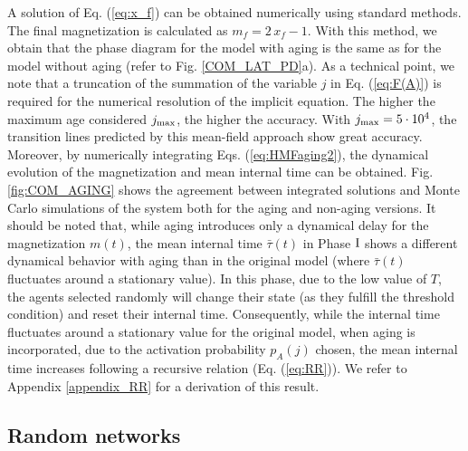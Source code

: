 A solution of Eq. (\ref{eq:x_f}) can be obtained numerically using standard methods. The final magnetization is calculated as $m_f = 2 \,x_f - 1$. With this method, we obtain that the phase diagram for the model with aging is the same as for the model without aging (refer to Fig. \ref{COM_LAT_PD}a). As a technical point, we note that a truncation of the summation of the variable $j$ in Eq. (\ref{eq:F(A)}) is required for the numerical resolution of the implicit equation. The higher the maximum age considered $j_{\rm max}$, the higher the accuracy. With $j_{\rm max} = 5 \cdot 10^4$, the transition lines predicted by this mean-field approach show great accuracy. Moreover, by numerically integrating Eqs. (\ref{eq:HMFaging2}), the dynamical evolution of the magnetization and mean internal time can be obtained. Fig. \ref{fig:COM_AGING} shows the agreement between integrated solutions and Monte Carlo simulations of the system both for the aging and non-aging versions. It should be noted that, while aging introduces only a dynamical delay for the magnetization $m(t)$, the mean internal time $\bar{\tau}(t)$ in Phase ${\rm I}$ shows a different dynamical behavior with aging than in the original model (where $\bar{\tau}(t)$ fluctuates around a stationary value). In this phase, due to the low value of $T$, the agents selected randomly will change their state (as they fulfill the threshold condition) and reset their internal time. Consequently, while the internal time fluctuates around a stationary value for the original model, when aging is incorporated, due to the activation probability $p_A(j)$ chosen, the mean internal time increases following a recursive relation (Eq. (\ref{eq:RR})). We refer to Appendix \ref{appendix_RR} for a derivation of this result.

\subsection{\label{sec:Complex networks aging} Random networks}

